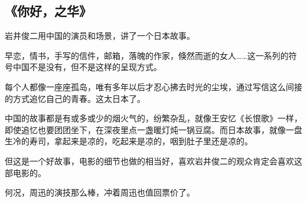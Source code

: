 \subsection{《你好，之华》}
岩井俊二用中国的演员和场景，讲了一个日本故事。

早恋，情书，手写的信件，邮箱，落魄的作家，倏然而逝的女人……这一系列的符号中国不是没有，但不是这样的呈现方式。

每个人都像一座座孤岛，唯有多年以后才忍心拂去时光的尘埃，通过写信这么间接的方式追忆自己的青春。这太日本了。

中国的故事都是有或多或少的烟火气的，纷繁杂乱，就像王安忆《长恨歌》一样，即使追忆也要团团坐下，在深夜里点一盏暖灯炖一锅豆腐。而日本故事，就像一盘生冷的寿司，拿起来是凉的，吃起来是凉的，咽到肚子里还是凉的。

但这是一个好故事，电影的细节也做的相当好，喜欢岩井俊二的观众肯定会喜欢这部电影的。

何况，周迅的演技那么棒，冲着周迅也值回票价了。
